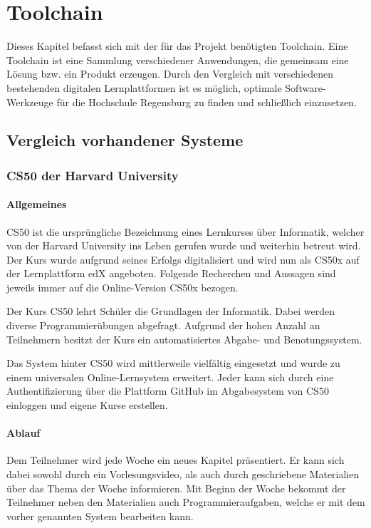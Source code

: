 \section{Toolchain}
Dieses Kapitel befasst sich mit der für das Projekt benötigten Toolchain.
Eine Toolchain ist eine Sammlung verschiedener Anwendungen, die gemeinsam eine
Lösung bzw. ein Produkt erzeugen. Durch den Vergleich mit verschiedenen
bestehenden digitalen Lernplattformen ist es möglich, optimale 
Software-Werkzeuge für die Hochschule Regensburg zu finden und schließlich
einzusetzen.

\subsection{Vergleich vorhandener Systeme}
\subsubsection{CS50 der Harvard University}
\paragraph{Allgemeines}
CS50 ist die ursprüngliche Bezeichnung eines Lernkurses über Informatik,
welcher von der Harvard University ins Leben gerufen wurde und weiterhin
betreut wird. Der Kurs wurde aufgrund seines Erfolgs digitalisiert und wird nun
als CS50x auf der Lernplattform edX angeboten. Folgende Recherchen und Aussagen
sind jeweils immer auf die Online-Version CS50x bezogen.

Der Kurs CS50 lehrt Schüler die Grundlagen der Informatik. Dabei werden
diverse Programmierübungen abgefragt. Aufgrund der hohen Anzahl an Teilnehmern
besitzt der Kurs ein automatisiertes Abgabe- und Benotungssystem.

Das System hinter CS50 wird mittlerweile vielfältig eingesetzt und wurde zu
einem universalen Online-Lernsystem erweitert. Jeder kann sich durch eine
Authentifizierung über die Plattform GitHub im Abgabesystem von CS50 einloggen
und eigene Kurse erstellen.

\paragraph{Ablauf}
Dem Teilnehmer wird jede Woche ein neues Kapitel präsentiert. Er kann sich dabei
sowohl durch ein Vorlesungsvideo, als auch durch geschriebene Materialien über
das Thema der Woche informieren. Mit Beginn der Woche bekommt der Teilnehmer
neben den Materialien auch Programmieraufgaben, welche er mit dem vorher
genannten System bearbeiten kann.

